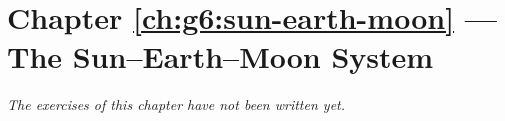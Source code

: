 \section*{Chapter \ref{ch:g6:sun-earth-moon} --- The Sun--Earth--Moon System}


\emph{The exercises of this chapter have not been written yet.}
